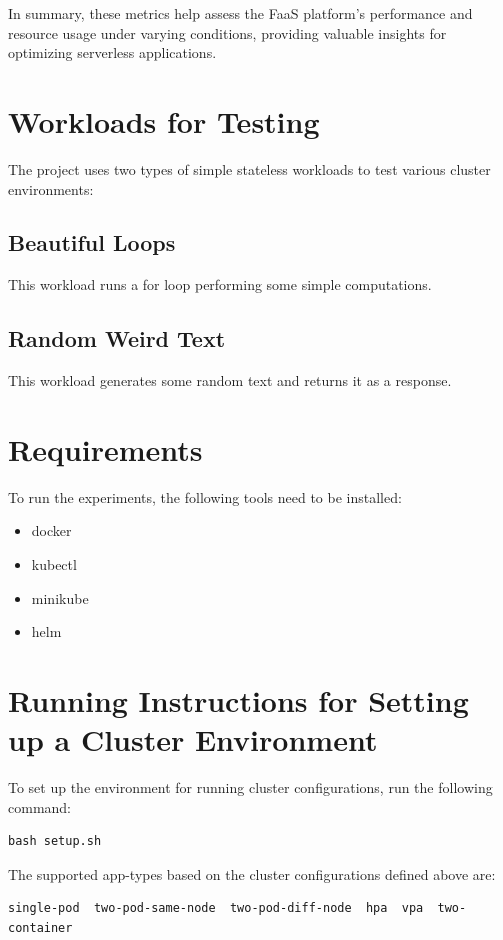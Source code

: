 \documentclass{article}
\begin{document}
In summary, these metrics help assess the FaaS platform's performance and resource usage under varying conditions, providing valuable insights for optimizing serverless applications.

\section{Workloads for Testing}
The project uses two types of simple stateless workloads to test various cluster environments:

\subsection{Beautiful Loops}
This workload runs a for loop performing some simple computations.

\subsection{Random Weird Text}
This workload generates some random text and returns it as a response.

\section{Requirements}
To run the experiments, the following tools need to be installed:

\begin{itemize}
   \item docker
   \item kubectl
   \item minikube
   \item helm
\end{itemize}

\section{Running Instructions for Setting up a Cluster Environment}
To set up the environment for running cluster configurations, run the following command:

\begin{verbatim}
bash setup.sh
\end{verbatim}

The supported app-types based on the cluster configurations defined above are:

\begin{verbatim}
single-pod  two-pod-same-node  two-pod-diff-node  hpa  vpa  two-container
\end{verbatim}
\end{document}
